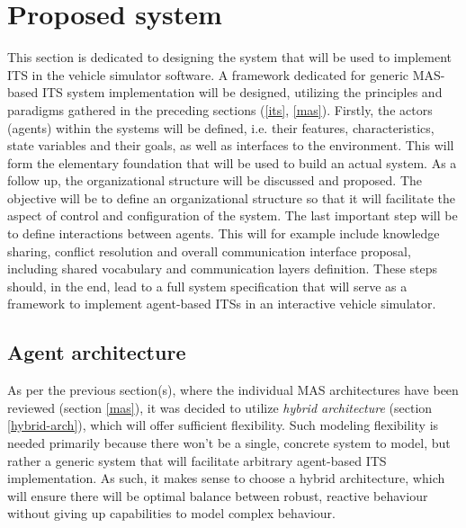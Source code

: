 \documentclass[main.tex]{subfiles}
\begin{document}
    
\section{Proposed system}

This section is dedicated to designing the system that will be used to implement ITS in the
vehicle simulator software. A framework dedicated for generic MAS-based ITS system
implementation will be designed, utilizing the principles and paradigms gathered in the
preceding sections (\ref{its}, \ref{mas}). Firstly, the actors (agents) within the systems will
be defined, i.e. their features, characteristics, state variables and their goals, as well as
interfaces to the environment. This will form the elementary foundation that will be used to
build an actual system.  As a follow up, the organizational structure will be discussed and
proposed. The objective will be to define an organizational structure so that it will
facilitate the aspect of control and configuration of the system. The last important step will
be to define interactions between agents.  This will for example include knowledge sharing,
conflict resolution and overall communication interface proposal, including shared vocabulary
and communication layers definition. These steps should, in the end, lead to a full system 
specification that will serve as a framework to implement agent-based ITSs in an interactive 
vehicle simulator.

\subsection{Agent architecture}

As per the previous section(s), where the individual MAS architectures have been reviewed
(section \ref{mas}), it was decided to utilize \emph{hybrid architecture} (section
\ref{hybrid-arch}), which will offer sufficient flexibility. Such modeling flexibility is 
needed primarily because there won't be a single, concrete system to model, but rather a 
generic system that will facilitate arbitrary agent-based ITS implementation. As such, it 
makes sense to choose a hybrid architecture, which will ensure there will be optimal balance 
between robust, reactive behaviour without giving up capabilities to model complex behaviour.


\clearpage
\end{document}
